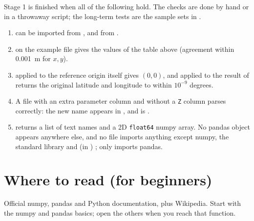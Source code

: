 \documentclass{article}
\begin{document}
Stage 1 is finished when all of the following hold. The checks are done by
hand or in a throwaway script; the long-term tests are the sample sets in
.

\begin{enumerate}
\item {} can be imported from , and
       from .
\item {} on the example file gives the values of the table
      above (agreement within 0.001~m for $x,y$).
\item {} applied to the reference origin itself gives
      $(0,0)$, and  applied to the result of
       returns the original latitude and longitude to
      within $10^{-9}$ degrees.
\item A file with an extra parameter column and without a \texttt{Z} column
      parses correctly: the new name appears in , and
       is .
\item {} returns a list of text names and a 2D \texttt{float64}
      numpy array. No pandas object appears anywhere else, and no file
      imports anything except numpy, the standard library and (in
      ) ; only  imports pandas.
\end{enumerate}

\section{Where to read (for beginners)}

Official numpy, pandas and Python documentation, plus Wikipedia. Start
with the numpy and pandas basics; open the others when you reach that function.
\end{document}
